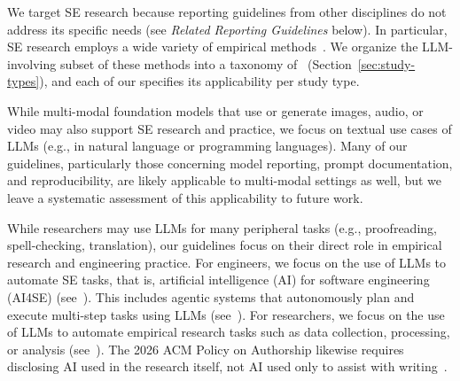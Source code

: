 
We target SE research because reporting guidelines from other disciplines do not address its specific needs (see \emph{Related Reporting Guidelines} below). In particular, SE research employs a wide variety of empirical methods~\cite{ralph2021empiricalstandardssoftwareengineering, DBLP:books/sp/WohlinRHORW24}. We organize the LLM-involving subset of these methods into a taxonomy of \studytypes\ifpaper~(Section~\ref{sec:study-types})\fi, and each of our \guidelines specifies its applicability per study type.


While multi-modal foundation models that use or generate images, audio, or video may also support SE research and practice, we focus on textual use cases of LLMs (e.g., in natural language or programming languages). Many of our guidelines, particularly those concerning model reporting, prompt documentation, and reproducibility, are likely applicable to multi-modal settings as well, but we leave a systematic assessment of this applicability to future work.


While researchers may use LLMs for many peripheral tasks (e.g., proofreading, spell-checking, translation), our guidelines focus on their direct role in empirical research and engineering practice.
For engineers, we focus on the use of LLMs to automate SE tasks, that is, artificial intelligence (AI) for software engineering (AI4SE) (see~\llmsforengineers).
This includes agentic systems that autonomously plan and execute multi-step tasks using LLMs (see~\design).
For researchers, we focus on the use of LLMs to automate empirical research tasks such as data collection, processing, or analysis (see~\llmsforresearcher).
The 2026 ACM Policy on Authorship likewise requires disclosing AI used in the research itself, not AI used only to assist with writing~\cite{ACM2026}.

